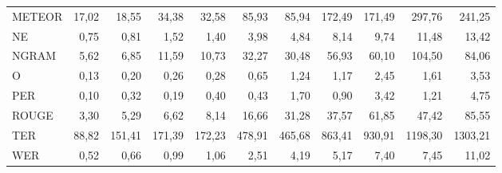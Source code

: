 \documentclass[11pt,a4paper]{article}
\begin{document}
\begin{table}[H]
{\begin{tabular}{l r r | r r | r r | r r | r r }
METEOR & 17,02         & 18,55        & 34,38          & 32,58        & 85,93         & 85,94         & 172,49         & 171,49        & 297,76         & 241,25        \\
NE     & 0,75          & 0,81         & 1,52           & 1,40         & 3,98          & 4,84          & 8,14           & 9,74          & 11,48          & 13,42         \\
NGRAM  & 5,62          & 6,85         & 11,59          & 10,73        & 32,27         & 30,48         & 56,93          & 60,10         & 104,50         & 84,06         \\
O      & 0,13          & 0,20         & 0,26           & 0,28         & 0,65          & 1,24          & 1,17           & 2,45          & 1,61           & 3,53          \\
PER    & 0,10          & 0,32         & 0,19           & 0,40         & 0,43          & 1,70          & 0,90           & 3,42          & 1,21           & 4,75          \\
ROUGE  & 3,30          & 5,29         & 6,62           & 8,14         & 16,66         & 31,28         & 37,57          & 61,85         & 47,42          & 85,55         \\
TER    & 88,82         & 151,41       & 171,39         & 172,23       & 478,91        & 465,68        & 863,41         & 930,91        & 1198,30        & 1303,21       \\
WER    & 0,52          & 0,66         & 0,99           & 1,06         & 2,51          & 4,19          & 5,17           & 7,40          & 7,45           & 11,02			\\ \hline
\end{tabular}}
\label{table:Ex1-ws_corpus100}
\normalsize
\end{table}
\end{document}
